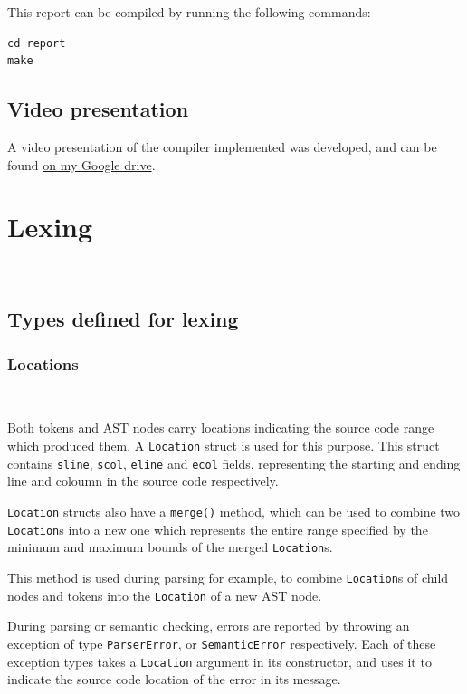 \documentclass[11pt,a4paper]{scrartcl}
\begin{document}
This report can be compiled by running the following commands:
\begin{verbatim}
cd report
make
\end{verbatim}

\subsection{Video presentation}

A video presentation of the compiler implemented was developed, and can be found \href{https://drive.google.com/file/d/1YSH7jUDW-PpR4YmvCW0ssTWVA2O2pTK9/view?usp=sharing}{on my Google drive}.

\newpage

\section{Lexing}~\label{sec:lexer}

\subsection{Types defined for lexing}

\subsubsection{Locations}~\label{sec:location}

Both tokens and AST nodes carry locations indicating the source code range which produced them. A \verb|Location| struct is used for this purpose. This struct contains \verb|sline|, \verb|scol|, \verb|eline| and \verb|ecol| fields, representing the starting and ending line and coloumn in the source code respectively.

\verb|Location| structs also have a \verb|merge()| method, which can be used to combine two \verb|Location|s into a new one which represents the entire range specified by the minimum and maximum bounds of the merged \verb|Location|s.

This method is used during parsing for example, to combine \verb|Location|s of child nodes and tokens into the \verb|Location| of a new AST node.

During parsing or semantic checking, errors are reported by throwing an exception of type \verb|ParserError|, or \verb|SemanticError| respectively. Each of these exception types takes a \verb|Location| argument in its constructor, and uses it to indicate the source code location of the error in its message.
\end{document}

